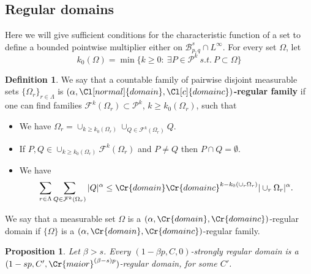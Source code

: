 \documentclass{amsart}
\newtheorem{proposition}[theorem]{Proposition}
\theoremstyle{definition}
\newtheorem{definition}[theorem]{Definition}
\newcommand{\Cll}[2][normal]{\Cl[#1]{#2}}
\newcommand{\Crr}[1]{\Cr{#1}}
\begin{document}
\subsection{Regular domains} \label{cf} Here we will give sufficient conditions for the characteristic function of a set to define a bounded pointwise multiplier either on $\mathcal{B}^{s}_{p,q}\cap L^\infty$. For every set  $\Omega$, let 
$$k_0(\Omega)=\min \{k\geq 0 \colon \ \exists P \in \mathcal{P}^k \ s.t. \ P \subset \Omega     \} $$

\begin{definition} We say that a countable family of pairwise disjoint measurable sets $\{\Omega_r\}_{r\in \Lambda}$  is  {\bf  $(\alpha, \Cll{domain},\Cll[c]{domainc})$-regular family} if  one can  find  families $\mathcal{F}^k(\Omega_r)\subset \mathcal{P}^k$, $k\geq  k_0(\Omega_r)$,  such that 
\begin{itemize}
\item[A.] We have $\Omega_r = \cup_{k\geq k_0(\Omega_r)} \cup_{Q\in \mathcal{F}^k(\Omega_r)} Q$.
\item[B.] If $P,Q \in \cup_{k\geq k_0(\Omega_r)} \mathcal{F}^k(\Omega_r)$ and $P\neq Q$ then $P\cap Q=\emptyset$. 
\item[C.] We have
\begin{equation}\label{dom} \sum_{r\in \Lambda} \sum_{Q\in \mathcal{F}^k(\Omega_r)} |Q|^{\alpha}\leq \Crr{domain} \Crr{domainc}^{k-k_0(\cup_r \Omega_r)} |\cup_r \Omega_r|^{\alpha}.\end{equation} 
\end{itemize}
We say that a measurable set $\Omega$ is a $(\alpha, \Crr{domain},\Crr{domainc})$-regular domain if $\{\Omega\}$  is a $(\alpha, \Crr{domain},\Crr{domainc})$-regular family.
\end{definition}

\begin{proposition} Let $\beta > s$. Every $(1-\beta p, C,0)$-strongly regular domain is a  $(1-sp,C',\Crr{maior}^{(\beta-s)p})$-regular domain,
for some $C'$. 
\end{proposition}
\end{document}
